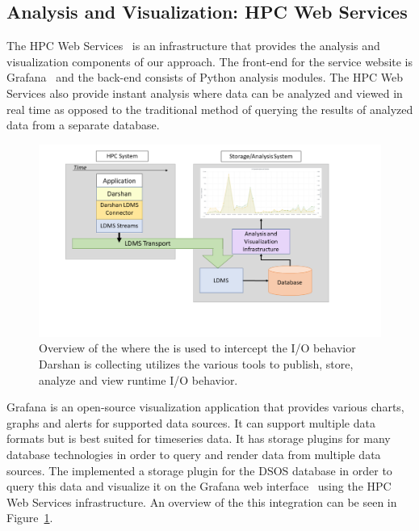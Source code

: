 \subsection{Analysis and Visualization: HPC Web Services}
The HPC Web Services~\cite{ClusterAV} is an infrastructure that provides the 
analysis and visualization components of our approach. 
The front-end for the service website is Grafana~\cite{grafana-website} and the 
back-end consists of Python analysis modules. The HPC Web Services also provide 
instant analysis where data can be analyzed and viewed in real time as opposed 
to the traditional method of querying the results of analyzed data from a separate database.

\begin{figure}
	\centering
	\includegraphics[trim=3cm 2cm 0cm 0cm, clip,width=1.2\linewidth]{figs/darshan-integration.pdf}
	\caption{Overview of the \Darshan{} where the \connector{} is used to intercept the I/O behavior Darshan is collecting utilizes the various tools to publish, store, analyze and view runtime I/O behavior.}
	\label{f:FrameworkOverview}
\end{figure}

Grafana is an open-source visualization application that provides various charts, 
graphs and alerts for supported data sources. It can support multiple data formats 
but is best suited for timeseries data. It has storage plugins for many database 
technologies in order to query and render data from multiple data sources. The 
\Darshan{} implemented a storage plugin for the DSOS database in order to query this 
data and visualize it on the Grafana web interface~\cite{grafana-website}
using the HPC Web Services infrastructure. An overview of the this integration 
can be seen in Figure~\ref{f:FrameworkOverview}.

